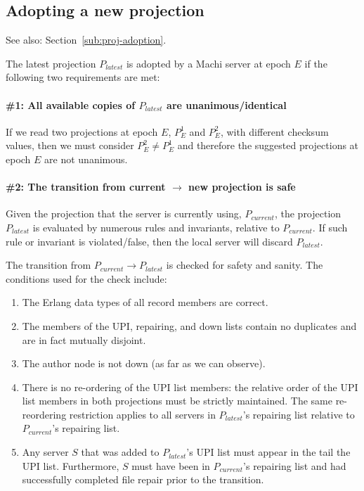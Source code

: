 \documentclass[preprint,10pt]{sigplanconf}
\begin{document}
\subsection{Adopting a new projection}
\label{sub:humming-proj-adoption}

See also: Section~\ref{sub:proj-adoption}.

The latest projection $P_{latest}$ is adopted by a Machi server at epoch $E$ if
the following two requirements are met:

\paragraph{\#1: All available copies of $P_{latest}$ are unanimous/identical}

If we read two projections at epoch $E$, $P^1_E$ and $P^2_E$, with
different checksum values, then we must consider $P^2_E \ne P^1_E$ and
therefore the suggested projections at epoch $E$ are not unanimous.

\paragraph{\#2: The transition from current $\rightarrow$ new projection is
safe}

Given the projection that the server is currently using,
$P_{current}$, the projection $P_{latest}$ is evaluated by numerous
rules and invariants, relative to $P_{current}$.
If such rule or invariant is
violated/false, then the local server will discard $P_{latest}$.

The transition from $P_{current} \rightarrow P_{latest}$ is checked
for safety and sanity.  The conditions used for the check include:

\begin{enumerate}
\item The Erlang data types of all record members are correct.
\item The members of the UPI, repairing, and down lists contain no
  duplicates and are in fact mutually disjoint.
\item The author node is not down (as far as we can observe).
\item There is no re-ordering of the UPI list members: the relative
  order of the UPI list members in both projections must be strictly
  maintained.
  The same re-reordering restriction applies to all
  servers in $P_{latest}$'s repairing list relative to
  $P_{current}$'s repairing list.
\item Any server $S$ that was added to $P_{latest}$'s UPI list must
  appear in the tail the UPI list.  Furthermore, $S$ must have been in
  $P_{current}$'s repairing list and had successfully completed file
  repair prior to the transition.
\end{enumerate}
\end{document}
